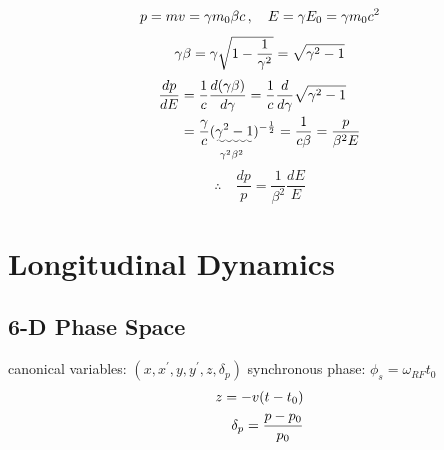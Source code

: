 \documentclass[10pt,a4paper]{ltjsarticle}
\begin{document}
\begin{tcolorbox}[title=式 (\ref{delta_p}) の導出]
    
    \begin{align}
        p = mv = \gamma m_0 \beta c\,  , \quad E = \gamma E_0 = \gamma m_0 c^2 \notag
    \end{align}
    \begin{equation}
        \gamma \beta = \gamma \sqrt{1-\frac{1}{\gamma^2}} \notag = \sqrt{\gamma^2 -1} \notag
    \end{equation}
    \begin{align}
        \frac{dp}{dE} & = \frac{1}{c}\frac{d(\gamma \beta)}{d\gamma} = \frac{1}{c}\frac{d}{d\gamma}\sqrt{\gamma^2 -1} \notag \\
        & = \frac{\gamma}{c} \underset{\gamma^2\beta^2}{(\uwave{\gamma^2 -1}})^{-\frac{1}{2}} = \frac{1}{c\beta}
        = \frac{p}{\beta^2 E}\notag
    \end{align}
    \begin{equation}
        \therefore \quad \frac{dp}{p} = \frac{1}{\beta^2}\frac{dE}{E} \tag{C.1}
    \end{equation}
\end{tcolorbox}

%
\section{Longitudinal Dynamics}
\subsection{6-D Phase Space}
canonical variables: $(x, x^{'}, y, y^{'}, z, \delta_p)$ synchronous phase: $\phi_s =\omega_{RF} t_0$
%
\begin{align}
     z = -v(t-t_0) \notag \\
     \delta_p =\frac{p-p_0}{p_0} \notag
\end{align}
%
\end{document}
